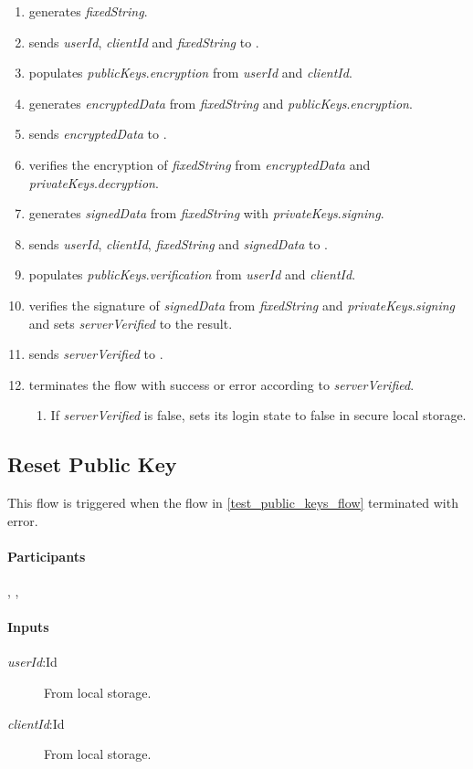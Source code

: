\documentclass[a4paper,10pt,draft]{article}
\newcommand{\signedData}{\emph{signedData}}
\newcommand{\encryptedData}{\emph{encryptedData}}
\newcommand{\serverVerified}{\emph{serverVerified}}
\newcommand{\privateKeys}{\emph{privateKeys}}
\newcommand{\publicKeys}{\emph{publicKeys}}
\newcommand{\signingKey}{\privateKeys{}.\emph{signing}}
\newcommand{\verificationKey}{\publicKeys{}.\emph{verification}}
\newcommand{\encryptionKey}{\publicKeys{}.\emph{encryption}}
\newcommand{\decryptionKey}{\privateKeys{}.\emph{decryption}}
\newcommand{\userId}{\emph{userId}}
\newcommand{\clientId}{\emph{clientId}}
\newcommand{\fixedString}{\emph{fixedString}}
\begin{document}
\begin{enumerate}
 \item \Client{} generates \fixedString{}.
 \item \Client{} sends \userId{}, \clientId{} and \fixedString{} to \Server{}.
 \item \Server{} populates \encryptionKey{} from \userId{} and \clientId{}.
 \item \Server{} generates \encryptedData{} from \fixedString{} and \encryptionKey{}.
 \item \Server{} sends \encryptedData{} to \Client{}.
 \item \Client{} verifies the encryption of \fixedString{} from \encryptedData{} and \decryptionKey{}.
 \item \Client{} generates \signedData{} from \fixedString{} with \signingKey{}.
 \item \Client{} sends \userId{}, \clientId{}, \fixedString{} and \signedData{} to \Server{}.
 \item \Server{} populates \verificationKey{} from \userId{} and \clientId{}.
 \item \Server{} verifies the signature of \signedData{} from \fixedString{} and \signingKey{} and sets \serverVerified{} to the result.
 \item \Server{} sends \serverVerified{} to \Client{}.
 \item \Client{} terminates the flow with success or error according to \serverVerified{}.
 \begin{enumerate}
  \item If \serverVerified{} is false, \Client{} sets its login state to false in secure local storage.
 \end{enumerate}
\end{enumerate}

\subsection{Reset Public Key}
\label{reset_public_key_flow}
This flow is triggered when the flow in \ref{test_public_keys_flow} terminated with error.

\paragraph{Participants} \Client{}, \Server{}, \User{}

\paragraph{Inputs}
\SpecialItem
\begin{description}
 \item[\userId{}:Id] From \Client{} local storage.
 \item[\clientId{}:Id] From \Client{} local storage.
\end{description}
\end{document}
